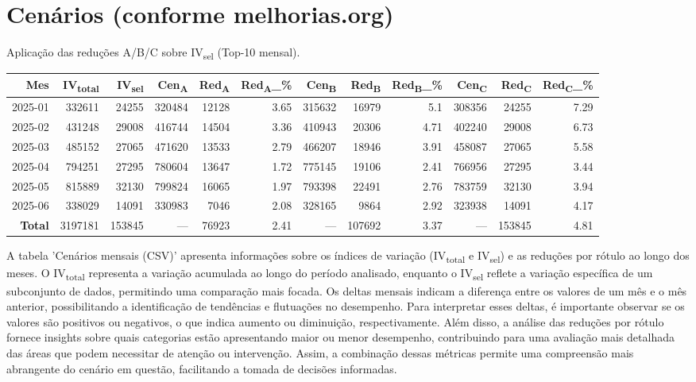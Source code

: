 \documentclass[11pt]{article}
\begin{document}
\section{Cenários (conforme melhorias.org)}
\label{sec:orgb360339}
Aplicação das reduções A/B/C sobre IV\textsubscript{sel} (Top-10 mensal).
\begingroup\scriptsize
\begin{center}
\begin{tabular}{rrrrrrrrrrrr}
Mes & IV\textsubscript{total} & IV\textsubscript{sel} & Cen\textsubscript{A} & Red\textsubscript{A} & Red\textsubscript{A}\_\% & Cen\textsubscript{B} & Red\textsubscript{B} & Red\textsubscript{B}\_\% & Cen\textsubscript{C} & Red\textsubscript{C} & Red\textsubscript{C}\_\%\\
\hline
2025-01 & 332611 & 24255 & 320484 & 12128 & 3.65 & 315632 & 16979 & 5.1 & 308356 & 24255 & 7.29\\
2025-02 & 431248 & 29008 & 416744 & 14504 & 3.36 & 410943 & 20306 & 4.71 & 402240 & 29008 & 6.73\\
2025-03 & 485152 & 27065 & 471620 & 13533 & 2.79 & 466207 & 18946 & 3.91 & 458087 & 27065 & 5.58\\
2025-04 & 794251 & 27295 & 780604 & 13647 & 1.72 & 775145 & 19106 & 2.41 & 766956 & 27295 & 3.44\\
2025-05 & 815889 & 32130 & 799824 & 16065 & 1.97 & 793398 & 22491 & 2.76 & 783759 & 32130 & 3.94\\
2025-06 & 338029 & 14091 & 330983 & 7046 & 2.08 & 328165 & 9864 & 2.92 & 323938 & 14091 & 4.17\\
\textbf{Total} & 3197181 & 153845 & — & 76923 & 2.41 & — & 107692 & 3.37 & — & 153845 & 4.81\\
\end{tabular}
\end{center}
\endgroup
A tabela 'Cenários mensais (CSV)' apresenta informações sobre os índices de variação (IV\textsubscript{total} e IV\textsubscript{sel}) e as reduções por rótulo ao longo dos meses. O IV\textsubscript{total} representa a variação acumulada ao longo do período analisado, enquanto o IV\textsubscript{sel} reflete a variação específica de um subconjunto de dados, permitindo uma comparação mais focada. Os deltas mensais indicam a diferença entre os valores de um mês e o mês anterior, possibilitando a identificação de tendências e flutuações no desempenho. Para interpretar esses deltas, é importante observar se os valores são positivos ou negativos, o que indica aumento ou diminuição, respectivamente. Além disso, a análise das reduções por rótulo fornece insights sobre quais categorias estão apresentando maior ou menor desempenho, contribuindo para uma avaliação mais detalhada das áreas que podem necessitar de atenção ou intervenção. Assim, a combinação dessas métricas permite uma compreensão mais abrangente do cenário em questão, facilitando a tomada de decisões informadas.
\end{document}
